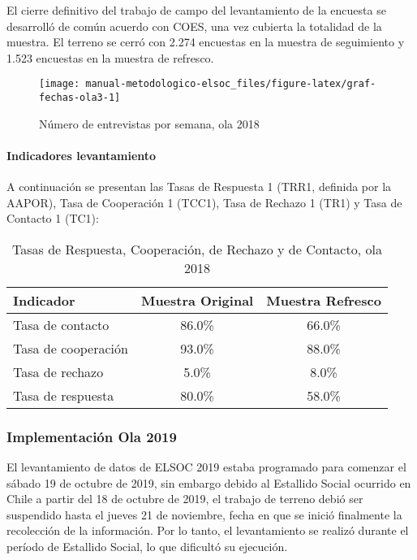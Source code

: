 \documentclass[
  12pt,
]{article}
\begin{document}
El cierre definitivo del trabajo de campo del levantamiento de la encuesta se desarrolló de común acuerdo con COES, una vez cubierta la totalidad de la muestra. El terreno se cerró con 2.274 encuestas en la muestra de seguimiento y 1.523 encuestas en la muestra de refresco.

\begin{figure}

{\centering \texttt{[image: manual-metodologico-elsoc\_files/figure-latex/graf-fechas-ola3-1]} 

}

\caption{Número de entrevistas por semana, ola 2018}\label{fig:graf-fechas-ola3}
\end{figure}

\hypertarget{indicadores-levantamiento-2}{%
\paragraph*{Indicadores levantamiento}\label{indicadores-levantamiento-2}}

A continuación se presentan las Tasas de Respuesta 1 (TRR1, definida por la AAPOR), Tasa de Cooperación 1 (TCC1), Tasa de Rechazo 1 (TR1) y Tasa de Contacto 1 (TC1):

\begin{table}[H]

\caption{\label{tab:tabla-tasas-ola3}Tasas de Respuesta, Cooperación, de Rechazo y de Contacto, ola 2018}
\centering
\begin{tabular}[t]{lcc}
\toprule
Indicador & Muestra Original & Muestra Refresco\\
\midrule
Tasa de contacto & 86.0\% & 66.0\%\\
Tasa de cooperación & 93.0\% & 88.0\%\\
Tasa de rechazo & 5.0\% & 8.0\%\\
Tasa de respuesta & 80.0\% & 58.0\%\\
\bottomrule
\end{tabular}
\end{table}

\hypertarget{implementaciuxf3n-ola-2019}{%
\subsubsection{Implementación Ola 2019}\label{implementaciuxf3n-ola-2019}}

El levantamiento de datos de ELSOC 2019 estaba programado para comenzar el sábado 19 de octubre de 2019, sin embargo debido al Estallido Social ocurrido en Chile a partir del 18 de octubre de 2019, el trabajo de terreno debió ser suspendido hasta el jueves 21 de noviembre, fecha en que se inició finalmente la recolección de la información. Por lo tanto, el levantamiento se realizó durante el período de Estallido Social, lo que dificultó su ejecución.
\end{document}
